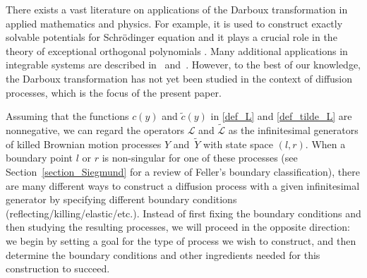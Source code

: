\documentclass[pdftex]{sigma}
\numberwithin{equation}{section}
\theoremstyle{definition}
\def\L{{\mathcal L}}
\begin{document}
There exists a vast literature on applications of the Darboux transformation in applied mathematics and physics. For example, it is used to construct exactly solvable potentials for Schr\"odinger equation \cite{Bagrov_1997} and it plays a crucial role in the theory of exceptional orthogonal polynomials \cite{Garcia_2019, Ullate_2014}. Many additional applications in integrable systems are described in~\cite{Gu_2005}
and~\cite{Matveev_1991}. However, to the best of our knowledge, the Darboux transformation has not yet been studied in the context of diffusion processes, which is the focus of the present paper.

Assuming that the functions $c(y)$ and $\tilde c(y)$ in \eqref{def_L} and \eqref{def_tilde_L} are nonnegative, we can regard the operators $\L$ and $\widetilde \L$ as the infinitesimal generators of killed Brownian motion processes $Y$ and~$\widetilde Y$ with state space $(l,r)$. When a boundary point $l$ or $r$ is non-singular for one of these processes (see Section~\ref{section_Siegmund} for a review of Feller's boundary classification), there are many different ways to construct a diffusion process with a given infinitesimal generator by specifying different boundary conditions (reflecting/killing/elastic/etc.). Instead of first fixing the boundary conditions and then studying the resulting processes, we will proceed in the opposite direction: we begin by setting a goal for the type of process we wish to construct, and then determine the boundary conditions and other ingredients needed for this construction to succeed.
\end{document}
